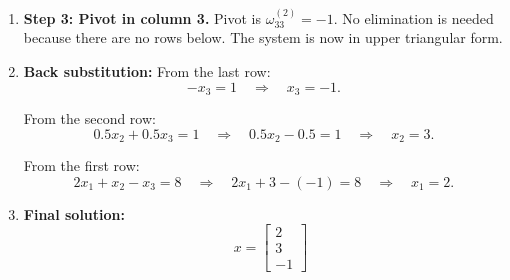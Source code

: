 \documentclass[../../../main.tex]{subfiles}
\begin{document}
\begin{enumerate}
    \item \textbf{Step 3: Pivot in column 3.}
          Pivot is $\omega_{33}^{(2)} = -1$. No elimination is needed because there are no rows below.
          The system is now in upper triangular form.
    \item \textbf{Back substitution:}
          From the last row:
          \begin{equation*}
              - x_3 = 1 \quad \Rightarrow \quad x_3 = -1.
          \end{equation*}

          From the second row:
          \begin{equation*}
              0.5x_2 + 0.5x_3 = 1 \quad \Rightarrow \quad 0.5x_2 - 0.5 = 1 \quad \Rightarrow \quad x_2 = 3.
          \end{equation*}

          From the first row:
          \begin{equation*}
              2x_1 + x_2 - x_3 = 8 \quad \Rightarrow \quad 2x_1 + 3 - (-1) = 8 \quad \Rightarrow \quad x_1 = 2.
          \end{equation*}
    \item \textbf{Final solution:}
          \begin{equation*}
              \quad
              x =
              \begin{bmatrix}
                  2 \\ 3 \\ -1
              \end{bmatrix}
          \end{equation*}
\end{enumerate}
\end{document}
